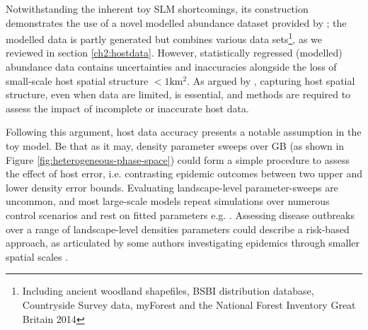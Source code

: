 Notwithstanding the inherent toy SLM shortcomings, its construction demonstrates the use of a novel modelled abundance
dataset provided by \cite{hill.data};
the modelled data is partly generated but combines various data sets\footnote{
Including ancient woodland shapefiles, BSBI distribution database, Countryside Survey data, myForest and the National Forest Inventory Great Britain 2014},
as we reviewed in section \ref{ch2:hostdata}.
However, statistically regressed (modelled) abundance data contains uncertainties and 
inaccuracies alongside the loss of small-scale host spatial structure $<1\mathrm{km^2}$.
As argued by \cite{13-challenges}, capturing host spatial structure, even when data are limited, 
is essential, and methods are required to assess the impact of incomplete or inaccurate host data.

Following this argument, host data accuracy presents a notable assumption in the toy model.
Be that as it may, density parameter sweeps over GB (as shown in Figure \ref{fig:heterogeneous-phase-space}) could 
form a simple procedure to assess the effect of host error, i.e. contrasting epidemic outcomes between two upper
and lower density error bounds. Evaluating landscape-level parameter-sweeps are uncommon, 
and most large-scale models repeat simulations over numerous control scenarios and rest on 
fitted parameters e.g. \cite{large-scale-control, doi:10.1111/j.1365-3059.2010.02391.x}.
Assessing disease outbreaks over a range of landscape-level densities parameters could describe a risk-based approach,
as articulated by some authors investigating epidemics through smaller spatial scales \cite{risk-potential-control}.

\newpage
